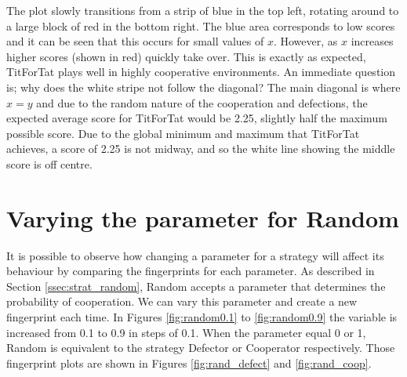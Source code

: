 The plot slowly transitions from a strip of blue in the top left, rotating around to a large block of red in the bottom right.
The blue area corresponds to low scores and it can be seen that this occurs for small values of $x$.
However, as $x$ increases higher scores (shown in red) quickly take over.
This is exactly as expected, TitForTat plays well in highly cooperative environments.
An immediate question is; why does the white stripe not follow the diagonal?
The main diagonal is where $x=y$ and due to the random nature of the cooperation and defections, the expected average score for TitForTat would be 2.25, slightly half the maximum possible score.
Due to the global minimum and maximum that TitForTat achieves, a score of 2.25 is not midway, and so the white line showing the middle score is off centre.



\section{Varying the parameter for Random}
It is possible to observe how changing a parameter for a strategy will affect its behaviour by comparing the fingerprints for each parameter.
As described in Section \ref{ssec:strat_random}, Random accepts a parameter that determines the probability of cooperation.
We can vary this parameter and create a new fingerprint each time.{}
In Figures \ref{fig:random0.1} to \ref{fig:random0.9} the variable is increased from 0.1 to 0.9 in steps of 0.1.
When the parameter equal 0 or 1, Random is equivalent to the strategy Defector or Cooperator respectively.
Those fingerprint plots are shown in Figures \ref{fig:rand_defect} and \ref{fig:rand_coop}.

